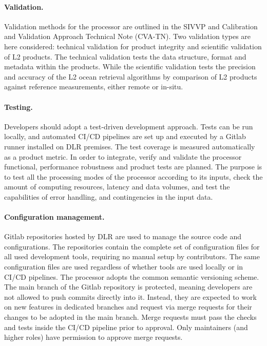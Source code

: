 \paragraph*{Validation.} Validation methods for the processor are outlined in the SIVVP and Calibration and Validation Approach Technical Note (CVA-TN). Two validation types are here considered: technical validation for product integrity and scientific validation of L2 products. The technical validation tests the data structure, format and metadata within the products. While the scientific validation tests the precision and accuracy of the L2 ocean retrieval algorithms by comparison of L2 products against reference measurements, either remote or in-situ.

\paragraph*{Testing.} Developers should adopt a test-driven development approach. Tests can be run locally, and automated CI/CD pipelines are set up and executed by a Gitlab runner installed on DLR premises. The test coverage is measured automatically as a product metric. In order to integrate, verify and validate the processor functional, performance robustness and product tests are planned. The purpose is to test all the processing modes of the processor according to its inputs, check the amount of computing resources, latency and data volumes, and test the capabilities of error handling, and contingencies in the input data.

\paragraph*{Configuration management.} Gitlab repositories hosted by DLR are used to manage the source code and configurations. The repositories contain the complete set of configuration files for all used development tools, requiring no manual setup by contributors. The same configuration files are used regardless of whether tools are used locally or in CI/CD pipelines. The processor adopts the common semantic versioning scheme. The main branch of the Gitlab repository is protected, meaning developers are not allowed to push commits directly into it. Instead, they are expected to work on new features in dedicated branches and request via merge requests for their changes to be adopted in the main branch. Merge requests must pass the checks and tests inside the CI/CD pipeline prior to approval. Only maintainers (and higher roles) have permission to approve merge requests.

